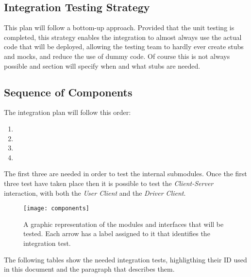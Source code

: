 \subsection{Integration Testing Strategy} %
\label{sub:integration_testing_strategy}
This plan will follow a bottom-up approach. Provided that the unit testing is completed, this strategy enables the integration to almost always use the actual code that will be deployed, allowing the testing team to hardly ever create stubs and mocks, and reduce the use of dummy code.
Of course this is not always possible and section \emph{} will specify when and what stubs are needed.

\subsection{Sequence of Components} %
\label{sub:sequence_of_components}
The integration plan will follow this order:
\begin{enumerate}
	\item {}
	\item {}
	\item {}
	\item {}
\end{enumerate}

The first three are needed in order to test the internal submodules. Once the first three test have taken place then it is possible to test the \emph{Client-Server} interaction, with both the \emph{User Client} and the \emph{Driver Client}.



\begin{figure*}[h!t]
    \centering
    \caption{A graphic representation of the modules and interfaces that will be tested. Each arrow has a label assigned to it that identifies the integration test.}
	\texttt{[image: components]}
\end{figure*}
\vfill
\clearpage

The following tables show the needed integration tests, highligthing their ID used in this document and the paragraph that describes them.

